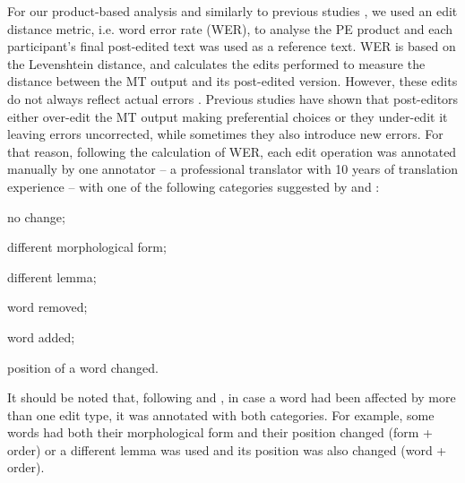 \documentclass[output=paper]{langscibook}
\begin{document}
For our product-based analysis and similarly to previous studies \citep{CarlBuch-Kromann2010, moorkens-obrien-2015-post, KoponenNikulin2019, KoponenSalmi2017}, we used an edit distance metric, i.e. word error rate (WER), to analyse the PE product and each participant’s final post-edited text was used as a reference text. WER is based on the Levenshtein distance, and calculates the edits performed to measure the distance between the MT output and its post-edited version.
However, these edits do not always reflect actual errors \citep{KoponenNikulin2019}. Previous studies \citep{De_almeida2013, KoponenSalmi2017, KoponenNikulin2019} have shown that post-editors either over-edit the MT output making preferential choices or they under-edit it leaving errors uncorrected, while sometimes they also introduce new errors. For that reason, following the calculation of WER, each edit operation was annotated manually by one annotator -- a professional translator with 10 years of translation experience -- with one of the following categories suggested by \citet{KoponenSalmi2017} and \citet{KoponenNikulin2019}:\largerpage

\begin{description}[noitemsep]
    \item [unedited:] no change;
    \item [form changed:] different morphological form;
    \item [word changed:] different lemma;
    \item [deleted:] word removed;
    \item [inserted:] word added;
    \item [order:] position of a word changed.
\end{description}

It should be noted that, following \citet{KoponenSalmi2017} and \citet{KoponenNikulin2019}, in case a word had been affected by more than one edit type, it was annotated with both categories. For example, some words had both their morphological form and their position changed (form + order) or a different lemma was used and its position was also changed (word + order). 
\end{document}
